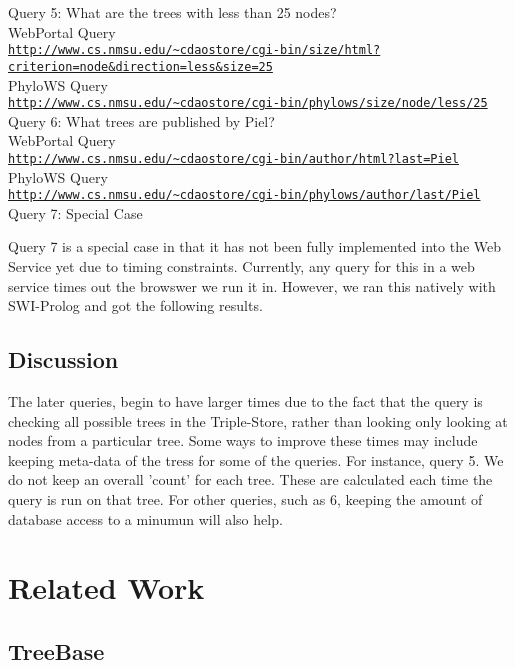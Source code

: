 \documentclass[10pt]{article}
\begin{document}
Query 5: What are the trees with less than 25 nodes?\\
 WebPortal Query \\
{\tt \url{http://www.cs.nmsu.edu/~cdaostore/cgi-bin/size/html?criterion=node&direction=less&size=25}}
\\PhyloWS Query\\
{\tt \url{http://www.cs.nmsu.edu/~cdaostore/cgi-bin/phylows/size/node/less/25}}
\\

Query 6: What trees are published by Piel?\\
 WebPortal Query \\
{\tt \url{http://www.cs.nmsu.edu/~cdaostore/cgi-bin/author/html?last=Piel}}
\\PhyloWS Query\\
{\tt \url{http://www.cs.nmsu.edu/~cdaostore/cgi-bin/phylows/author/last/Piel}}
\\

Query 7:  Special Case

Query 7 is a special case in that it has not been fully implemented into the
Web Service yet due to timing constraints.  Currently, any query for this in a
web service times out the browswer we run it in.  However, we ran this natively
with SWI-Prolog and got the following results.

\subsection{Discussion}

The later queries, begin to have larger times due to the fact that the query is checking all possible trees in the Triple-Store, rather than looking only looking at nodes from a particular tree.  Some ways to improve these times may include keeping meta-data of the tress for some of the queries.  For instance, query 5.  We do not keep an overall 'count' for each tree. These are calculated each time the query is run on that tree.  For other queries, such as 6, keeping the amount of database access to a minumun will also help.

\section{Related Work}

\subsection{TreeBase}
\end{document}
